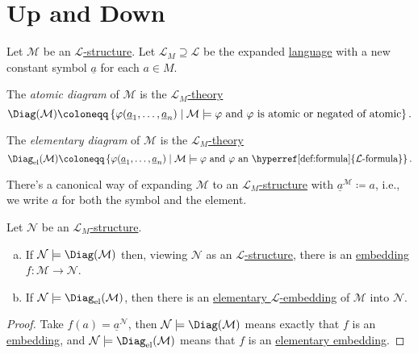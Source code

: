 \section{Up and Down}
\begin{definition*}
	Let \(\mathcal{M} \) be an \hyperref[def:structure]{\(\mathcal{L}\)-structure}. Let \(\mathcal{L} _M \supseteq \mathcal{L} \)  be the expanded \hyperref[def:language]{language} with a new constant symbol \(\underline{a}\) for each \(a\in M\).

	\begin{definition}\label{def:atomic-diagram}
		The \emph{atomic diagram} of \(\mathcal{M} \) is the \hyperref[def:theory]{\(\mathcal{L} _{M}\)-theory}
		\[
			\Diag(\mathcal{M} ) \coloneqq \left\{ \varphi (\underline{a}_1, \ldots , \underline{a}_n) \mid \mathcal{M} \models \varphi \text{ and \(\varphi \) is atomic or negated of atomic} \right\}.
		\]
	\end{definition}

	\begin{definition}\label{def:elementary-diagram}
		The \emph{elementary diagram} of \(\mathcal{M} \) is the \hyperref[def:theory]{\(\mathcal{L} _{M}\)-theory}
		\[
			\Diag_{\mathrm{el}}(\mathcal{M} ) \coloneqq \left\{ \varphi (\underline{a}_1, \ldots , \underline{a}_n) \mid \mathcal{M} \models \varphi \text{ and \(\varphi \) an \hyperref[def:formula]{\(\mathcal{L}\)-formula}} \right\}.
		\]
	\end{definition}
\end{definition*}

\begin{note}
	There's a canonical way of expanding \(\mathcal{M} \) to an \hyperref[def:structure]{\(\mathcal{L} _M\)-structure} with \(\underline{a}^{\mathcal{M}} \coloneqq a\), i.e., we write \(a\) for both the symbol and the element.
\end{note}

\begin{lemma}\label{lma:lec13}
	Let \(\mathcal{N} \) be an \hyperref[def:structure]{\(\mathcal{L} _M\)-structure}.
	\begin{enumerate}[(a)]
		\item If \(\mathcal{N} \models \Diag(\mathcal{M} )\) then, viewing \(\mathcal{N} \) as an \hyperref[def:structure]{\(\mathcal{L} \)-structure}, there is an \hyperref[def:embedding]{embedding} \(f\colon \mathcal{M} \to \mathcal{N} \).
		\item If \(\mathcal{N} \models \Diag_{\mathrm{el} }(\mathcal{M} )\), then there is an \hyperref[def:elementary-embedding]{elementary \(\mathcal{L} \)-embedding} of \(\mathcal{M} \) into \(\mathcal{N} \).
	\end{enumerate}
\end{lemma}
\begin{proof}
	Take \(f(a) = \underline{a}^{\mathcal{N} } \), then \(\mathcal{N} \models \Diag(\mathcal{M} )\) means exactly that \(f\) is an \hyperref[def:embedding]{embedding}, and \(\mathcal{N} \models \Diag_{\mathrm{el} }(\mathcal{M} )\) means that \(f\) is an \hyperref[def:elementary-embedding]{elementary embedding}.
\end{proof}

